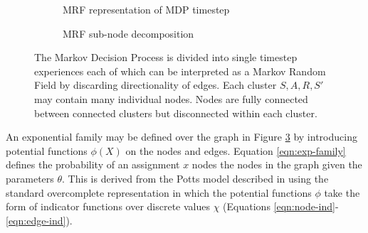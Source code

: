 \documentclass{article} %
\begin{document}
\begin{figure}
  \centering
  \begin{subfigure}[b]{0.4\textwidth}
    \centering
    \caption{MRF representation of MDP timestep}
    \label{fig:mrf}
  \end{subfigure}
  \begin{subfigure}[b]{0.5\textwidth}
    \centering
    \caption{MRF sub-node decomposition}
    \label{fig:decomp}
  \end{subfigure}
  \caption{The Markov Decision Process is divided into single timestep experiences each of which can be interpreted as a Markov Random Field by discarding directionality of edges. Each cluster $S,A,R,S'$ may contain many individual nodes. Nodes are fully connected between connected clusters but disconnected within each cluster.}
  \label{fig:structure}
\end{figure}

An exponential family may be defined over the graph in Figure \ref{fig:structure} by introducing potential functions $\phi(X)$ on the nodes and edges. Equation \ref{eqn:exp-family} defines the probability of an assignment $x$ nodes the nodes in the graph given the parameters $\theta$. This is derived from the Potts model described in \cite{wainwright08} using the standard overcomplete representation in which the potential functions $\phi$ take the form of indicator functions over discrete values $\chi$ (Equations \ref{eqn:node-ind}-\ref{eqn:edge-ind}).
\end{document}
